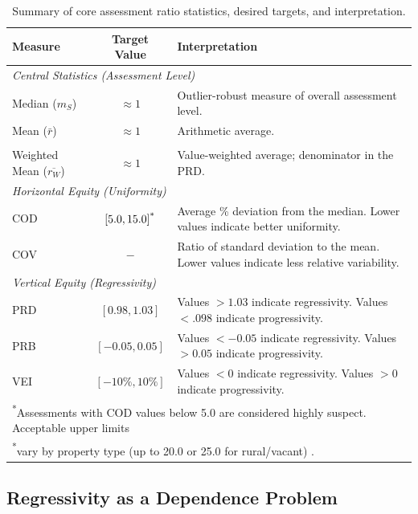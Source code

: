 \documentclass{article}
\theoremstyle{plain}
\theoremstyle{definition}
\newcommand{\1}{\mathbf{1}}
\begin{document}
\begin{table}[!ht]
\centering
\caption{Summary of core assessment ratio statistics, desired targets, and interpretation.}
\label{tab:assessment_metrics_summary}
\begin{tabular}{lcp{8.5cm}}
\toprule
\textbf{Measure} & \textbf{Target Value} & \textbf{Interpretation} \\
\midrule 
\multicolumn{3}{l}{\textit{Central Statistics (Assessment Level)}} \vspace{3mm} \\
Median ($m_S$) & \(\approx 1\) & Outlier-robust measure of overall assessment level. \\
Mean ($\bar r$) & \(\approx 1\) & Arithmetic average. \\\\
Weighted Mean ($\overline{r_W}$) & \(\approx 1\) & Value-weighted average; denominator in the PRD. \\
\midrule
\multicolumn{3}{l}{\textit{Horizontal Equity (Uniformity)}} \vspace{3mm} \\
COD & \([5.0,15.0]\textsuperscript{*}\) & Average \% deviation from the median. Lower values indicate better uniformity. \\
COV & $-$ & Ratio of standard deviation to the mean. Lower values indicate less relative variability. \\
\midrule
\multicolumn{3}{l}{\textit{Vertical Equity (Regressivity)}} \vspace{3mm} \\
PRD & \([0.98,1.03]\) & Values \(>1.03\) indicate regressivity. Values \(<.098\) indicate progressivity. \\
PRB & \([-0.05,0.05]\) & Values \(<-0.05\) indicate regressivity. Values \(>0.05\) indicate progressivity. \\
VEI & \([-10\%,10\%]\) & Values \(<0\) indicate regressivity. Values \(>0\) indicate progressivity.\\
\bottomrule
\multicolumn{3}{l}{\footnotesize \textsuperscript{*}Assessments with COD values below 5.0 are considered highly suspect. Acceptable upper limits} \\
\multicolumn{3}{l}{\footnotesize {\color{white}\textsuperscript{*}}vary by property type (up to 20.0 or 25.0 for rural/vacant) \cite{IAAO2025ExposureRatio}.}
\end{tabular}
\end{table}

\subsection{Regressivity as a Dependence Problem}
\label{subsec:dependence_problem}
\end{document}
